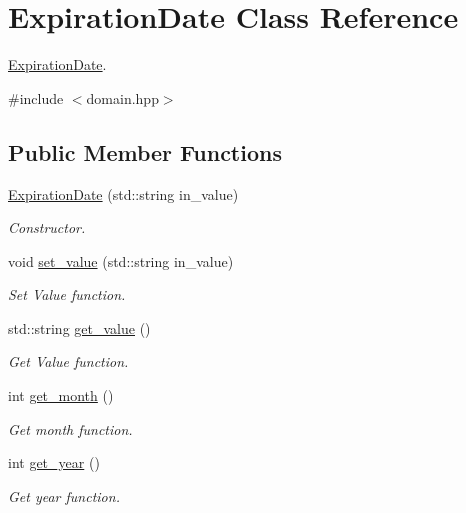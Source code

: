 \hypertarget{classExpirationDate}{}\section{Expiration\+Date Class Reference}
\label{classExpirationDate}


\hyperlink{classExpirationDate}{Expiration\+Date}.  




{\ttfamily \#include $<$domain.\+hpp$>$}

\subsection*{Public Member Functions}
\begin{DoxyCompactItemize}
\item 
\hyperlink{classExpirationDate_ada7d6416fcc75c1faafd578ae56c1ed7}{Expiration\+Date} (std\+::string in\+\_\+value)
\begin{DoxyCompactList}\small\item\em Constructor. \end{DoxyCompactList}\item 
void \hyperlink{classExpirationDate_a83f4b1ca035e44618f3ef9a09b38be65}{set\+\_\+value} (std\+::string in\+\_\+value)
\begin{DoxyCompactList}\small\item\em Set Value function. \end{DoxyCompactList}\item 
std\+::string \hyperlink{classExpirationDate_a96a351141951ebc7eb9004f3f683ff51}{get\+\_\+value} ()
\begin{DoxyCompactList}\small\item\em Get Value function. \end{DoxyCompactList}\item 
int \hyperlink{classExpirationDate_a8ef282d7a42caad75d156599620be08d}{get\+\_\+month} ()
\begin{DoxyCompactList}\small\item\em Get month function. \end{DoxyCompactList}\item 
int \hyperlink{classExpirationDate_afc44a74a98182eb61690c2e7e1521e1b}{get\+\_\+year} ()
\begin{DoxyCompactList}\small\item\em Get year function. \end{DoxyCompactList}\end{DoxyCompactItemize}
